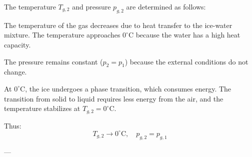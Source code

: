 The temperature \( T_{g,2} \) and pressure \( p_{g,2} \) are determined as follows:  

The temperature of the gas decreases due to heat transfer to the ice-water mixture. The temperature approaches \( 0^\circ\text{C} \) because the water has a high heat capacity.  

The pressure remains constant (\( p_2 = p_1 \)) because the external conditions do not change.  

At \( 0^\circ\text{C} \), the ice undergoes a phase transition, which consumes energy. The transition from solid to liquid requires less energy from the air, and the temperature stabilizes at \( T_{g,2} = 0^\circ\text{C} \).  

Thus:  
\[
T_{g,2} \to 0^\circ\text{C}, \quad p_{g,2} = p_{g,1}
\]  

---